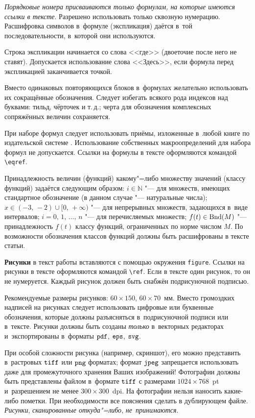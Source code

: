\textit{Порядковые номера присваиваются только формулам, на которые имеются ссылки в тексте}.
Разрешено использовать только сквозную нумерацию. 
Расшифровка символов в~формуле (экспликация) даётся в~той последовательности, в~которой они используются. 

Строка экспликации начинается со слова <<где>> (двоеточие после него не ставят). Допускается использование слова <<Здесь>>, если формула перед экспликацией заканчивается точкой. 

Вместо одинаковых повторяющихся блоков в~формулах желательно использовать их сокращённые обозначения. Следует избегать всякого рода индексов над буквами: тильд, чёрточек и т.\,д.;
черта для обозначения комплексных сопряжённых  величин сохраняется. 

При наборе формул следует использовать приёмы, изложенные в~любой книге по издательской системе \LaTeXe. Использование собственных макроопределений для набора формул не допускается. 
Ссылки на формулы в тексте оформляются командой \verb"\eqref".

\smallskip

Принадлежность величин (функций) какому"=либо множеству значений (классу функций) задаётся следующим образом: 
$i\in \mathbb N$ "--- для множеств, имеющих стандартное обозначение (в данном случае "--- натуральные числа); $x\in (-3,\,-2)\cup[0,\,+\infty)$ "--- для непрерывных множеств, задающихся в~виде интервалов; $i=0,\,1,\,\dots,\, n $ "--- для перечисляемых множеств; $f(t)\in
{\rm Bnd}(M)$ "--- принадлежность $f(t)$ классу функций, ограниченных по норме числом $M$.
По возможности обозначения классов функций должны быть расшифрованы в тексте статьи.

\smallskip

\textbf{Рисунки} в текст работы вставляются с помощью окружения {\tt figure}. 
Ссылки на рисунки в тексте оформляются командой \verb"\ref".
Если в тексте один рисунок, то  он не нумеруется. 
Каждый рисунок должен быть снабжён подрисуночной подписью.

Рекомендуемые размеры рисунков: $60\times150$, $60\times 70$~мм. Вместо громоздких надписей на
рисунках  следует использовать цифровые или буквенные обозначения, которые должны разъясняться в~подрисуночной подписи или в~тексте.
Рисунки должны быть созданы {\it только} в~векторных редакторах и~экспортированы в~форматы $\tt pdf$, $\tt eps$, $\tt svg$. 

При особой сложности рисунка (например, скриншот), его можно представить в~растровых  $\tt tiff$ или $\tt png$ форматах; формат $\tt jpeg$ запрещается использовать даже для промежуточного хранения Ваших изображений! 
Фотографии должны быть представлены файлом в~формате $\tt tiff$ с размерами $1024\times 768$~pt и~разрешением не менее $300\times 300$~dpi. 
На фотографии нельзя наносить какие-либо пометки. 
При необходимости все пояснения сделать в дублирующем файле. 
{\it Рисунки}, {\it сканированные откуда"=либо}, \mbox{\it не принимаются}.


